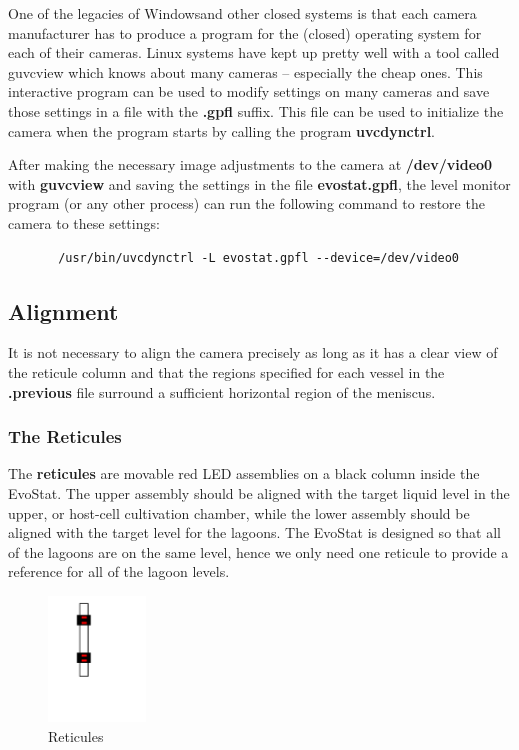 \documentclass[10pt,letterpaper]{article}
\begin{document}
One of the legacies of Windows\textregistered and other closed systems is that each camera manufacturer has to produce a program for the (closed) operating system for each of their cameras.  Linux systems have kept up pretty well with a tool called guvcview which knows about many cameras -- especially the cheap ones.  This interactive program can be used to modify settings on many cameras and save those settings in a file with the {\bf .gpfl} suffix.  This file can be used to initialize the camera when the program starts by calling the program {\bf uvcdynctrl}.

After making the necessary image adjustments to the camera at {\bf /dev/video0} with {\bf guvcview} and saving the settings in the file {\bf evostat.gpfl}, the level monitor program (or any other process) can run the following command to restore the camera to these settings:
\begin{verbatim}
       /usr/bin/uvcdynctrl -L evostat.gpfl --device=/dev/video0
\end{verbatim}

\subsection*{Alignment}
It is not necessary to align the camera precisely as long as it has a clear view of the reticule column and that the regions specified for each vessel in the {\bf .previous} file surround a sufficient horizontal region of the meniscus.

\subsubsection*{The Reticules}
The {\bf reticules} are movable red LED assemblies on a black column inside the EvoStat. The upper assembly should be aligned with the target liquid level in the upper, or host-cell cultivation chamber, while the lower assembly should be aligned with the target level for the lagoons.  The EvoStat is designed so that all of the lagoons are on the same level, hence we only need one reticule to provide a reference for all of the lagoon levels.

\begin{figure}
\centering
\includegraphics[width=0.23\textwidth,scale=0.2]{reticules.png}
\caption{\label{fig:reticules}Reticules}
\end{figure}
\end{document}

